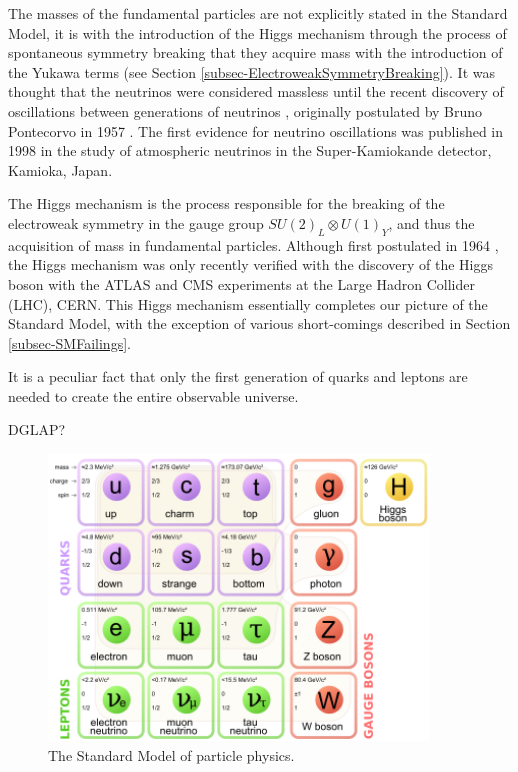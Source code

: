 The masses of the fundamental particles are not explicitly stated in the Standard Model, it is with the introduction of the Higgs mechanism through the process of spontaneous symmetry breaking that they acquire mass with the introduction of the Yukawa terms (see Section \ref{subsec-ElectroweakSymmetryBreaking}). It was thought that the neutrinos were considered massless until the recent discovery of oscillations between generations of neutrinos \cite{PhysRevLett.81.1562}, originally postulated by Bruno Pontecorvo in 1957 \cite{Pontecorvo:1967fh}. The first evidence for neutrino oscillations was published in 1998 in the study of atmospheric neutrinos in the Super-Kamiokande detector, Kamioka, Japan. 

The Higgs mechanism is the process responsible for the breaking of the electroweak symmetry in the gauge group $SU(2)_L \otimes U(1)_Y$, and thus the acquisition of mass in fundamental particles. Although first postulated in 1964 \cite{PhysRevLett.13.508, PhysRevLett.13.321, PhysRevLett.13.585}, the Higgs mechanism was only recently verified with the discovery of the Higgs boson with the ATLAS \cite{Aad:2012tfa} and CMS \cite{b846af59f42d440a9058d93ed5df44cf} experiments at the Large Hadron Collider (LHC), CERN. This Higgs mechanism essentially completes our picture of the Standard Model, with the exception of various short-comings described in Section \ref{subsec-SMFailings}.


It is a peculiar fact that only the first generation of quarks and leptons are needed to create the entire observable universe.

DGLAP?

\begin{figure} \label{fig-SM}
\begin{center}
\includegraphics[width=0.9\textwidth]{Figures/StandardModel.png}
\caption{The Standard Model of particle physics.}
\end{center}
\end{figure}

